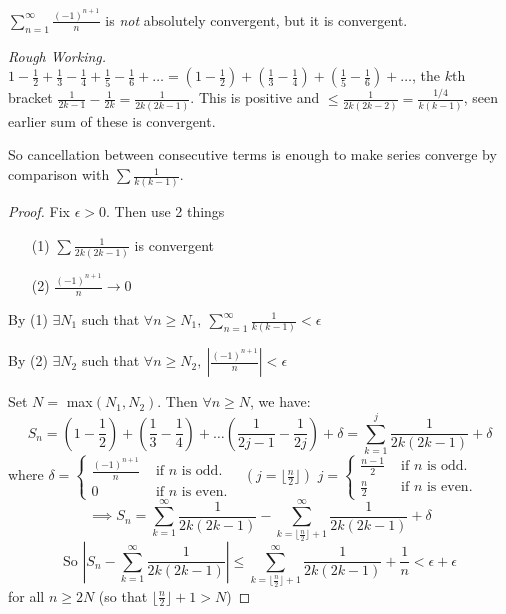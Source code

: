 \documentclass[twoside]{scrartcl}
\begin{document}
\begin{example}
$\sum_{n=1}^{\infty} \frac{(-1)^{n+1}}{n}$ is \emph{not} absolutely convergent, but it is convergent.


\textit{Rough Working.} $1 - \frac{1}{2} + \frac{1}{3} - \frac{1}{4} + \frac{1}{5} - \frac{1}{6} + \dots = (1-\frac{1}{2}) + (\frac{1}{3} - \frac{1}{4}) + (\frac{1}{5} -\frac{1}{6}) + \dots$, the $k$th bracket $\frac{1}{2k-1} - \frac{1}{2k} = \frac{1}{2k(2k-1)}$. This is positive and $\leq \frac{1}{2k(2k-2)} = \frac{1/4}{k(k-1)}$, seen earlier sum of these is convergent.

So cancellation between consecutive terms is enough to make series converge by comparison with $\sum \frac{1}{k(k-1)}$.

\begin{proof}
Fix $\epsilon >0.$ Then use 2 things\begin{enumerate}
\item[(1)] $\sum \frac{1}{2k(2k-1)}$	is convergent
\item[(2)] $\frac{(-1)^{n+1}}{n}\to 0$
\end{enumerate}
By (1) $\exists N_1$ such that $\forall n \geq N_1,~ \sum_{n=1}^{\infty} \frac{1}{k(k-1)} < \epsilon$

By (2) $\exists N_2$ such that $\forall n \geq N_2,~ \left|\frac{(-1)^{n+1}}{n}\right| < \epsilon$

Set $N =$ max$(N_1,N_2)$. Then $\forall n \geq N$, we have:
\[S_n = \left(1-\frac{1}{2}\right) + \left(\frac{1}{3} - \frac{1}{4}\right) + \dots \left(\frac{1}{2j-1} - \frac{1}{2j} \right) + \delta = \sum_{k=1}^{j} \frac{1}{2k(2k-1)} + \delta\] 
where $\delta = \begin{cases}
 	\frac{(-1)^{n+1}}{n} & \text{ if } n \text{ is odd.}\\
 	0 & \text{ if } n \text{ is even.}
 \end{cases}
$ $~~\left(j = \lfloor \frac{n}{2} \rfloor\right)$   $j = \begin{cases}
 	\frac{n-1}{2} & \text{ if } n \text{ is odd.}\\
 	\frac{n}{2} & \text{ if } n \text{ is even.}
 \end{cases}
$
\[\implies S_n = \sum_{k=1}^{\infty} \frac{1}{2k(2k-1)} - \sum_{k=\lfloor \frac{n}{2} \rfloor + 1}^{\infty} \frac{1}{2k(2k-1)} + \delta\]
\[\text{So } \left|S_n - \sum_{k=1}^{\infty} \frac{1}{2k(2k-1)} \right| \leq \sum_{k=\lfloor \frac{n}{2} \rfloor + 1}^{\infty} \frac{1}{2k(2k-1)} + \frac{1}{n} < \epsilon + \epsilon\] for all $n \geq 2N$ (so that $\lfloor \frac{n}{2} \rfloor + 1 >N$) 
\end{proof}
\end{example}\vspace*{10pt}
\end{document}
